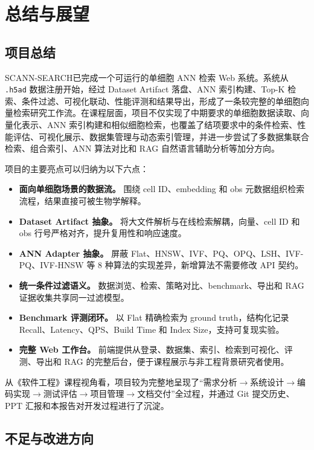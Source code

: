 \documentclass[UTF8,a4paper,12pt]{ctexrep}
\newcommand{\project}{SCANN-SEARCH}
\begin{document}
\chapter{总结与展望}

\section{项目总结}

\project 已完成一个可运行的单细胞 ANN 检索 Web 系统。系统从 \texttt{.h5ad} 数据注册开始，经过 Dataset Artifact 落盘、ANN 索引构建、Top-K 检索、条件过滤、可视化联动、性能评测和结果导出，形成了一条较完整的单细胞向量检索研究工作流。在课程层面，项目不仅实现了中期要求的单细胞数据读取、向量化表示、ANN 索引构建和相似细胞检索，也覆盖了结项要求中的条件检索、性能评估、可视化展示、数据集管理与动态索引管理，并进一步尝试了多数据集联合检索、组合索引、ANN 算法对比和 RAG 自然语言辅助分析等加分方向。

项目的主要亮点可以归纳为以下六点：

\begin{itemize}
  \item \textbf{面向单细胞场景的数据流。} 围绕 cell ID、embedding 和 obs 元数据组织检索流程，结果直接可被生物学解释。
  \item \textbf{Dataset Artifact 抽象。} 将大文件解析与在线检索解耦，向量、cell ID 和 obs 行号严格对齐，提升复用性和响应速度。
  \item \textbf{ANN Adapter 抽象。} 屏蔽 Flat、HNSW、IVF、PQ、OPQ、LSH、IVF-PQ、IVF-HNSW 等 8 种算法的实现差异，新增算法不需要修改 API 契约。
  \item \textbf{统一条件过滤语义。} 数据浏览、检索、策略对比、benchmark、导出和 RAG 证据收集共享同一过滤模型。
  \item \textbf{Benchmark 评测闭环。} 以 Flat 精确检索为 ground truth，结构化记录 Recall、Latency、QPS、Build Time 和 Index Size，支持可复现实验。
  \item \textbf{完整 Web 工作台。} 前端提供从登录、数据集、索引、检索到可视化、评测、导出和 RAG 的完整后台，便于课程展示与非工程背景研究者使用。
\end{itemize}

从《软件工程》课程视角看，项目较为完整地呈现了``需求分析$\to$系统设计$\to$编码实现$\to$测试评估$\to$项目管理$\to$文档交付''全过程，并通过 Git 提交历史、PPT 汇报和本报告对开发过程进行了沉淀。

\section{不足与改进方向}
\end{document}
